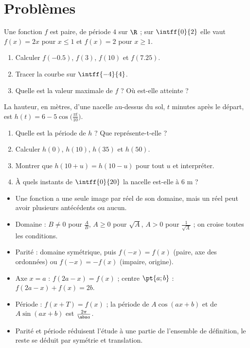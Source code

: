 \section{Problèmes}
\begin{exercise}
Une fonction $f$ est paire, de période $4$ sur $\R$ ; sur $\intff{0}{2}$ elle vaut $f(x)=2x$ pour $x\le1$ et $f(x)=2$ pour $x\ge1$.
\begin{enumerate}
\item Calculer $f(-\num{0,5})$, $f(3)$, $f(10)$ et $f(\num{7,25})$.
\item Tracer la courbe sur $\intff{-4}{4}$.
\item Quelle est la valeur maximale de $f$ ? Où est-elle atteinte ?
\end{enumerate}
\end{exercise}
\begin{exercise}
La hauteur, en mètres, d'une nacelle au-dessus du sol, $t$ minutes après le départ, est $h(t)=6-5\cos\bigl(\frac{\pi t}{10}\bigr)$.
\begin{enumerate}
\item Quelle est la période de $h$ ? Que représente-t-elle ?
\item Calculer $h(0)$, $h(10)$, $h(35)$ et $h(50)$.
\item Montrer que $h(10+u)=h(10-u)$ pour tout $u$ et interpréter.
\item À quels instants de $\intff{0}{20}$ la nacelle est-elle à $6$ m ?
\end{enumerate}
\end{exercise}

\begin{summary}[À retenir]
\begin{itemize}
\item Une fonction a une seule image par réel de son domaine, mais un réel peut avoir plusieurs antécédents ou aucun.
\item Domaine : $B\ne0$ pour $\frac AB$, $A\ge0$ pour $\sqrt A$, $A>0$ pour $\frac{1}{\sqrt A}$ ; on croise toutes les conditions.
\item Parité : domaine symétrique, puis $f(-x)=f(x)$ (paire, axe des ordonnées) ou $f(-x)=-f(x)$ (impaire, origine).
\item Axe $x=a$ : $f(2a-x)=f(x)$ ; centre $\pt{a;b}$ : $f(2a-x)+f(x)=2b$.
\item Période : $f(x+T)=f(x)$ ; la période de $A\cos(ax+b)$ et de $A\sin(ax+b)$ est $\frac{2\pi}{\abs a}$.
\item Parité et période réduisent l'étude à une partie de l'ensemble de définition, le reste se déduit par symétrie et translation.
\end{itemize}
\end{summary}
\ifmxteacher{}\fi
